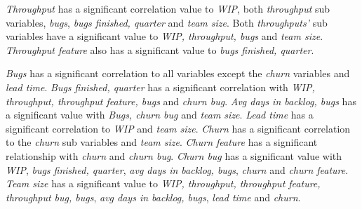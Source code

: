 \documentclass[UKenglish]{ifimaster}  %
\begin{document}
\textit{Throughput} has a significant correlation value to \textit{WIP}, both \textit{throughput} sub variables, \textit{bugs}, \textit{bugs finished, quarter} and \textit{team size}. Both \textit{throughputs'} sub variables have a significant value to \textit{WIP, throughput, bugs} and \textit{team size}. \textit{Throughput feature} also has a significant value to \textit{bugs finished, quarter}.  


\textit{Bugs} has a significant correlation to all variables except the \textit{churn} variables and \textit{lead time}. \textit{Bugs finished, quarter}  has a significant correlation with \textit{WIP, throughput, throughput feature, bugs} and \textit{churn bug}. \textit{Avg days in backlog, bugs} has a significant value with \textit{Bugs, churn bug} and \textit{team size}. \textit{Lead time} has a significant correlation to \textit{WIP} and \textit{team size}. \textit{Churn} has a significant correlation to the \textit{churn} sub variables and \textit{team size}. \textit{Churn feature} has a significant relationship with \textit{churn} and \textit{churn bug}. \textit{Churn bug} has a significant value with \textit{WIP}, \textit{bugs finished, quarter}, \textit{avg days in backlog, bugs}, \textit{churn} and \textit{churn feature}.  \textit{Team size} has a significant value to \textit{WIP, throughput, throughput feature, throughput bug, bugs}, \textit{avg days in backlog, bugs}, \textit{lead time} and \textit{churn}.
\end{document}
